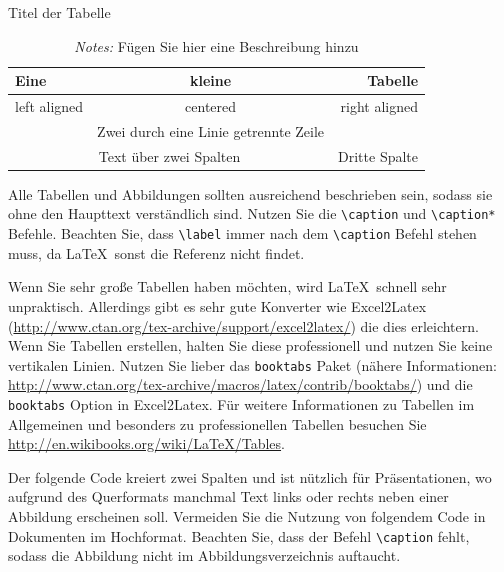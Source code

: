 \documentclass[a4paper,12pt]{scrartcl} %
\begin{document}
\begin{table}
\caption[Titel für Inhaltsverzeichnis]{Titel der Tabelle}
\label{tab:Table1}
\centering
 \begin{tabular}{lcr}
   Eine & kleine  & Tabelle\\
\toprule
   left aligned & centered & right aligned \\
   & Zwei durch eine Linie getrennte Zeile  & \\
\cmidrule{2-3}
   \multicolumn{2}{c}{Text über zwei Spalten} & Dritte Spalte \\
\bottomrule
\end{tabular}
\caption*{\footnotesize{\emph{Notes:} Fügen Sie hier eine Beschreibung hinzu}} %
\end{table}

Alle Tabellen und Abbildungen sollten ausreichend beschrieben sein, sodass sie ohne den Haupttext verständlich sind. Nutzen Sie die \verb|\caption| und \verb|\caption*| Befehle. Beachten Sie, dass \verb|\label| immer nach dem \verb|\caption| Befehl stehen muss, da \LaTeX\ sonst die Referenz nicht findet.

Wenn Sie sehr große Tabellen haben möchten, wird \LaTeX\ schnell sehr unpraktisch. Allerdings gibt es sehr gute Konverter wie Excel2Latex (\url{http://www.ctan.org/tex-archive/support/excel2latex/}) die dies erleichtern. Wenn Sie Tabellen erstellen, halten Sie diese professionell und nutzen Sie keine vertikalen Linien. Nutzen Sie lieber das \texttt{booktabs} Paket (nähere Informationen: \url{http://www.ctan.org/tex-archive/macros/latex/contrib/booktabs/}) und die \texttt{booktabs} Option in Excel2Latex. Für weitere Informationen zu Tabellen im Allgemeinen und besonders zu professionellen Tabellen besuchen Sie \url{http://en.wikibooks.org/wiki/LaTeX/Tables}.

Der folgende Code kreiert zwei Spalten und ist nützlich für Präsentationen, wo aufgrund des Querformats manchmal Text links oder rechts neben einer Abbildung erscheinen soll. Vermeiden Sie die Nutzung von folgendem Code in Dokumenten im Hochformat. Beachten Sie, dass der Befehl \verb|\caption| fehlt, sodass die Abbildung nicht im Abbildungsverzeichnis auftaucht.
\end{document}
